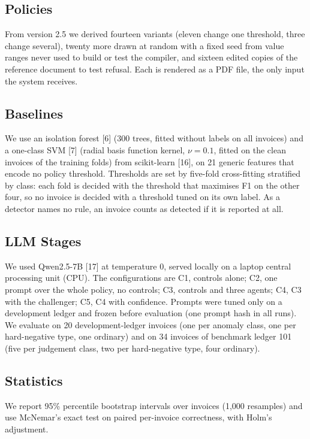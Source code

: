 \documentclass[9pt,a4paper,twocolumn]{extarticle}
\begin{document}
\subsection{Policies}
From version 2.5 we derived fourteen variants (eleven change one threshold, three change several), twenty more drawn at random with a fixed seed from value ranges never used to build or test the compiler, and sixteen edited copies of the reference document to test refusal. Each is rendered as a PDF file, the only input the system receives.

\subsection{Baselines}
We use an isolation forest [6] (300 trees, fitted without labels on all invoices) and a one-class SVM [7] (radial basis function kernel, $\nu=0.1$, fitted on the clean invoices of the training folds) from scikit-learn [16], on 21 generic features that encode no policy threshold. Thresholds are set by five-fold cross-fitting stratified by class: each fold is decided with the threshold that maximises F1 on the other four, so no invoice is decided with a threshold tuned on its own label. As a detector names no rule, an invoice counts as detected if it is reported at all.

\subsection{LLM Stages}
\label{sec:llmsetup}
We used Qwen2.5-7B [17] at temperature 0, served locally on a laptop central processing unit (CPU). The configurations are C1, controls alone; C2, one prompt over the whole policy, no controls; C3, controls and three agents; C4, C3 with the challenger; C5, C4 with confidence. Prompts were tuned only on a development ledger and frozen before evaluation (one prompt hash in all runs). We evaluate on 20 development-ledger invoices (one per anomaly class, one per hard-negative type, one ordinary) and on 34 invoices of benchmark ledger 101 (five per judgement class, two per hard-negative type, four ordinary).

\subsection{Statistics}
We report 95\% percentile bootstrap intervals over invoices (1{,}000 resamples) and use McNemar's exact test on paired per-invoice correctness, with Holm's adjustment.
\end{document}
